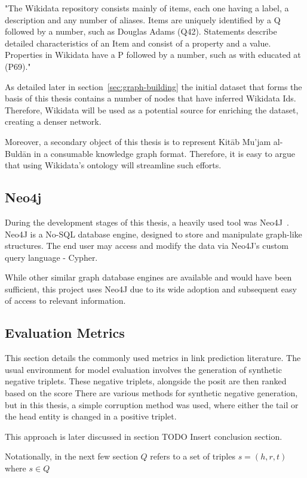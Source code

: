 "The Wikidata repository consists mainly of items, each one having a label, a description and any number of aliases.
Items are uniquely identified by a Q followed by a number, such as Douglas Adams (Q42).
Statements describe detailed characteristics of an Item and consist of a property and a value.
Properties in Wikidata have a P followed by a number, such as with educated at (P69)."~\cite{Wikidata}

As detailed later in section~\ref{sec:graph-building} the initial dataset that forms the basis of this thesis contains a number of nodes that have inferred Wikidata Ids.
Therefore, Wikidata will be used as a potential source for enriching the dataset, creating a denser network.

Moreover, a secondary object of this thesis is to represent Kitāb Mu'jam al-Buldān in a consumable knowledge graph format.
Therefore, it is easy to argue that using Wikidata's ontology will streamline such efforts.

\subsection{Neo4j}\label{subsec:introduction-neo4j}
During the development stages of this thesis, a heavily used tool was Neo4J~\cite{Neo4j}.
Neo4J is a No-SQL database engine, designed to store and manipulate graph-like structures.
The end user may access and modify the data via Neo4J's custom query language - Cypher.

While other similar graph database engines are available and would have been sufficient, this project uses Neo4J
due to its wide adoption and subsequent easy of access to relevant information.

\subsection{Evaluation Metrics}
This section details the commonly used metrics in link prediction literature.
The usual environment for model evaluation involves the generation of synthetic negative triplets.
These negative triplets, alongside the posit are then ranked based on the score
There are various methods for synthetic negative generation, but in this thesis, a simple corruption
method was used, where either the tail or the head entity is changed in a positive triplet.

This approach is later discussed in section TODO Insert conclusion section.

Notationally, in the next few section $Q$ refers to a set of triples $s = (h,r,t)$ where $s \in Q$~\cite{ampligraph}
